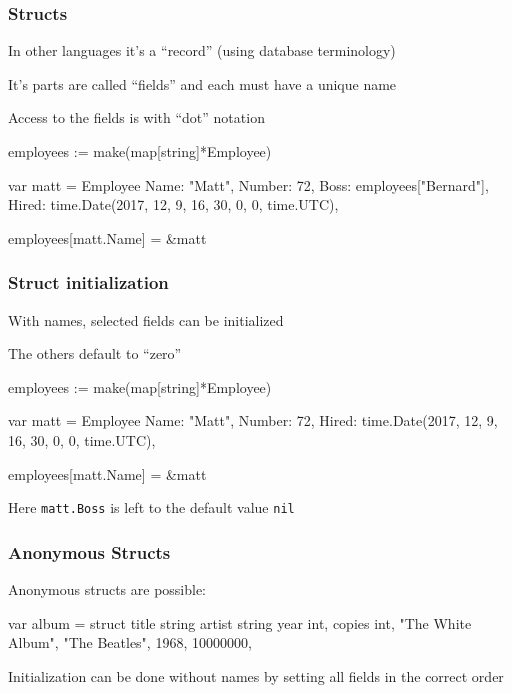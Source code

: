 \documentclass[handout,compress,t,11pt]{beamer}
\begin{document}
\begin{frame}[fragile]
    \frametitle{Structs}
    In other languages it's a ``record'' (using database terminology) \par
    \vspace{0.2\baselineskip}
    It's parts are called ``fields'' and each must have a unique name \par
    \vspace{\baselineskip}
    Access to the fields is with ``dot'' notation 
\begin{golang}
employees := make(map[string]*Employee)

var matt = Employee{
    Name:   "Matt",
    Number: 72,
    Boss:   employees["Bernard"],
    Hired:  time.Date(2017, 12, 9, 16, 30, 0, 0, time.UTC),
}

employees[matt.Name] = &matt
\end{golang}
\end{frame}

\begin{frame}[fragile]
    \frametitle{Struct initialization}
With names, selected fields can be initialized \par
\vspace{0.4\baselineskip}
The others default to ``zero''
\vspace{0.4\baselineskip}
\begin{golang}
employees := make(map[string]*Employee)

var matt = Employee{
    Name:   "Matt",
    Number: 72,
    Hired:  time.Date(2017, 12, 9, 16, 30, 0, 0, time.UTC),
}

employees[matt.Name] = &matt
\end{golang}
\vspace{0.4\baselineskip}
Here \verb|matt.Boss| is left to the default value \verb|nil|
\end{frame}

\begin{frame}[fragile]
    \frametitle{Anonymous Structs}
    Anonymous structs are possible:
\begin{golang}
var album = struct {
    title  string
    artist string
    year   int,
    copies int,
}{
    "The White Album",
    "The Beatles",
    1968,
    10000000,
}
\end{golang}
\vspace{\baselineskip}
Initialization can be done without names by setting all fields in the correct order \par
\end{frame}
\end{document}
